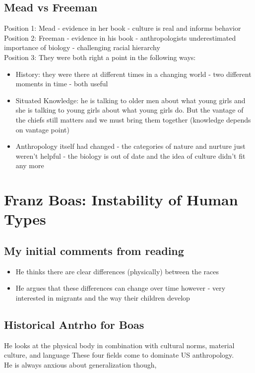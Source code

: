 \documentclass{article}
\begin{document}
\subsection{Mead vs Freeman}
Position 1: Mead - evidence in her book - culture is real and informs behavior \\ 
Position 2: Freeman - evidence in his book - anthropologists underestimated importance of biology - challenging racial hierarchy \\
Position 3: They were both right a point in the following ways:
\begin{itemize}
\item History: they were there at different times in a changing world - two different moments in time - both useful
\item Situated Knowledge: he is talking to older men about what young girls and she is talking to young girls about what young girls do. But the vantage of the chiefs still matters and we must bring them together (knowledge depends on vantage point)
\item Anthropology itself had changed - the categories of nature and nurture just weren't helpful - the biology is out of date and the idea of culture didn't fit any more
\end{itemize}

\section{Franz Boas: Instability of Human Types}
\subsection{My initial comments from reading}
\begin{itemize}
\item He thinks there are clear differences (physically) between the races
\item He argues that these differences can change over time however - very interested in migrants and the way their children develop
\end{itemize}

\subsection{Historical Antrho for Boas}
He looks at the physical body in combination with cultural norms, material culture, and language These four fields come to dominate US anthropology. \\ He is always anxious about generalization though,
\end{document}

